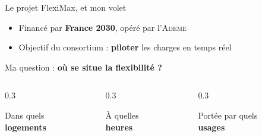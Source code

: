 \begin{frame}{Le projet FlexiMax, et mon volet}

\begin{itemize}\setlength{\itemsep}{0.5em}
  \item Financé par \textbf{France 2030}, opéré par l'\textsc{Ademe}
  \item Objectif du consortium : \textbf{piloter} les charges en temps réel
\end{itemize}

\vspace{0.8em}
\begin{center}
{\large Ma question : \textbf{où se situe la flexibilité ?}}
\end{center}

\vspace{0.5em}
\begin{columns}[T]
\begin{column}{0.3\textwidth}\centering
\colorbox{BleuClair}{\parbox{0.92\textwidth}{\centering\vspace{0.4em}
Dans quels\\\textbf{logements}\vspace{0.4em}}}
\end{column}
\begin{column}{0.3\textwidth}\centering
\colorbox{BleuClair}{\parbox{0.92\textwidth}{\centering\vspace{0.4em}
À quelles\\\textbf{heures}\vspace{0.4em}}}
\end{column}
\begin{column}{0.3\textwidth}\centering
\colorbox{BleuClair}{\parbox{0.92\textwidth}{\centering\vspace{0.4em}
Portée par quels\\\textbf{usages}\vspace{0.4em}}}
\end{column}
\end{columns}

\vspace{0.9em}
\end{frame}

\newcommand{\planetape}[4]{%
  \begin{tikzpicture}
    \node[rectangle, rounded corners=4pt, fill=#4, inner sep=0pt,
          minimum height=1.15cm, text width=0.90\textwidth] (band) {};
    \node[circle, fill=BleuFonce, text=white, font=\bfseries\normalsize,
          minimum size=0.72cm, anchor=west] (num) at ([xshift=0.45cm]band.west) {#1};
    \node[anchor=west, align=left, text width=0.72\textwidth]
         at ([xshift=0.35cm]num.east)
         {\textbf{#2}\\[0.15em]{\small #3}};
  \end{tikzpicture}\\[0.35em]}

